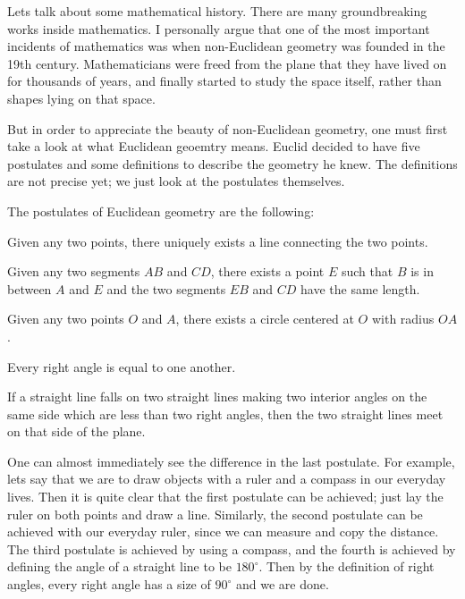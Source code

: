 \label{sec:euclidgeo}

Lets talk about some mathematical history.
There are many groundbreaking works inside mathematics.
I personally argue that
one of the most important incidents of mathematics
was when non-Euclidean geometry was founded in the 19th century.
Mathematicians were freed from the plane that
they have lived on for thousands of years,
and finally started to study the space itself,
rather than shapes lying on that space.

But in order to appreciate the beauty of non-Euclidean geometry,
one must first take a look at what Euclidean geoemtry means.
Euclid decided to have five postulates and some definitions
to describe the geometry he knew.
The definitions are not precise yet;
we just look at the postulates themselves.

\begin{definition}
    \label{def:euclidpos}
    The postulates of Euclidean geometry are the following:
    \begin{nlist}
        \item Given any two points,
        there uniquely exists a line connecting the two points.
        
        \item Given any two segments \(AB\) and \(CD\),
        there exists a point \(E\) such that
        \(B\) is in between \(A\) and \(E\)
        and the two segments \(EB\) and \(CD\) have the same length.
        
        \item Given any two points \(O\) and \(A\),
        there exists a circle centered at \(O\) with radius \(OA\).
        
        \item Every right angle is equal to one another.
        
        \item If a straight line falls on two straight lines
        making two interior angles on the same side
        which are less than two right angles,
        then the two straight lines meet on that side of the plane.
    \end{nlist}
\end{definition}

One can almost immediately see the difference in the last postulate.
For example, lets say that
we are to draw objects with a ruler and a compass
in our everyday lives.
Then it is quite clear that the first postulate can be achieved;
just lay the ruler on both points and draw a line.
Similarly, the second postulate can be achieved with our everyday ruler,
since we can measure and copy the distance.
The third postulate is achieved by using a compass,
and the fourth is achieved
by defining the angle of a straight line to be \(180^\circ\).
Then by the definition of right angles,
every right angle has a size of \(90^\circ\) and we are done.

